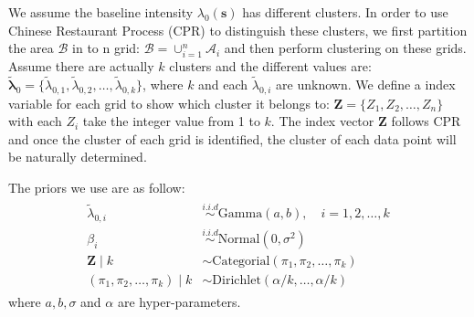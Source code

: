 \documentclass[12pt]{article}
\begin{document}
We assume the baseline intensity $\lambda_0(\mathbf{s})$ has different
clusters. In order to use Chinese Restaurant Process (CPR) to
distinguish these clusters, we first partition the area $\mathcal{B}$
in to n grid: $\mathcal{B} = \cup_{i=1}^n \mathcal{A}_i$ and then
perform clustering on these grids. Assume there are actually $k$
clusters and the different values are:
$\tilde{\bm{\lambda}}_0 = \{\tilde{\lambda}_{0, 1}, \tilde{\lambda}_{0, 2},\dots, \tilde{\lambda}_{0, k}\}$, 
where $k$ and each $\tilde{\lambda}_{0, i}$ are unknown. We define a
index variable for each grid to show which cluster it belongs to:
$\mathbf{Z} = \{Z_1, Z_2, \dots, Z_n\}$ with each $Z_i$ take the
integer value from 1 to $k$. The index vector $\mathbf{Z}$ follows CPR
and once the cluster of each grid is identified, the cluster of each
data point will be naturally determined.


The priors we use are as follow:
\begin{align*}
  \begin{split}
    \tilde{\lambda}_{0, i} &\stackrel{i.i.d}{\sim} \mathrm{Gamma}(a,
    b),\quad i = 1, 2, \dots, k\\
    \beta_i &\stackrel{i.i.d}{\sim} \mathrm{Normal}(0, \sigma^2)\\
    \mathbf{Z}\mid k &\sim \mathrm{Categorial}(\pi_1, \pi_2, \dots, \pi_k)\\
    (\pi_1, \pi_2, \dots, \pi_k)\mid k &\sim
    \mathrm{Dirichlet}(\alpha/k, \dots, \alpha/k)
  \end{split}
\end{align*}
where $a, b, \sigma$ and $\alpha$ are hyper-parameters.
\end{document}
